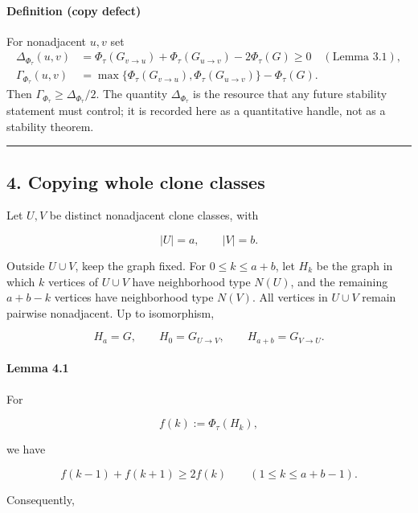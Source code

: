 \documentclass[english,11pt,a4paper]{article}
\begin{document}
\paragraph{Definition (copy defect)}\label{definition-copy-defect}

For nonadjacent \(u,v\) set \[
\begin{aligned}
\Delta_{\Phi_\tau}(u,v)
&=\Phi_\tau(G_{v\to u})+\Phi_\tau(G_{u\to v})-2\Phi_\tau(G)\ge0
\quad(\text{Lemma 3.1}),\\
\Gamma_{\Phi_\tau}(u,v)
&=\max\{\Phi_\tau(G_{v\to u}),\Phi_\tau(G_{u\to v})\}-\Phi_\tau(G).
\end{aligned}
\] Then \(\Gamma_{\Phi_\tau}\ge\Delta_{\Phi_\tau}/2\). The quantity
\(\Delta_{\Phi_\tau}\) is the resource that any future stability
statement must control; it is recorded here as a quantitative handle,
not as a stability theorem.

\begin{center}\rule{0.5\linewidth}{0.5pt}\end{center}

\subsection{4. Copying whole clone
classes}\label{copying-whole-clone-classes}

Let \(U,V\) be distinct nonadjacent clone classes, with

\[
|U|=a,
\qquad
|V|=b.
\]

Outside \(U\cup V\), keep the graph fixed. For \(0\le k\le a+b\), let
\(H_k\) be the graph in which \(k\) vertices of \(U\cup V\) have
neighborhood type \(N(U)\), and the remaining \(a+b-k\) vertices have
neighborhood type \(N(V)\). All vertices in \(U\cup V\) remain pairwise
nonadjacent. Up to isomorphism,

\[
H_a=G,
\qquad
H_0=G_{U\to V},
\qquad
H_{a+b}=G_{V\to U}.
\]

\paragraph{Lemma 4.1}\label{lemma-4.1}

For

\[
f(k):=\Phi_\tau(H_k),
\]

we have

\[
f(k-1)+f(k+1)\ge2f(k)
\qquad
(1\le k\le a+b-1).
\]

Consequently,
\end{document}
